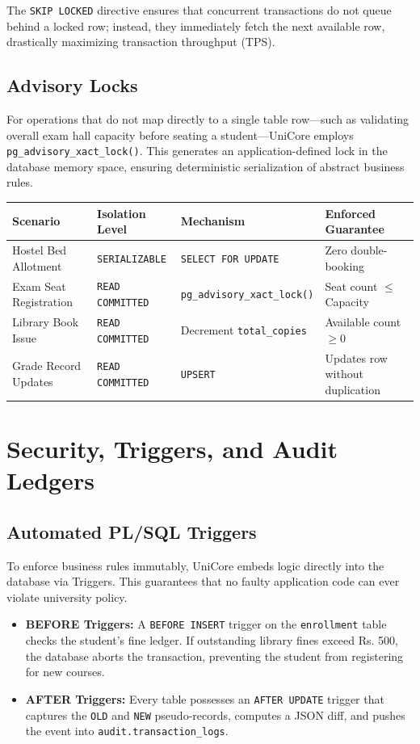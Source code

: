 \documentclass[11pt,a4paper]{article}
\begin{document}
The \texttt{SKIP LOCKED} directive ensures that concurrent transactions do not queue behind a locked row; instead, they immediately fetch the next available row, drastically maximizing transaction throughput (TPS).

\subsection{Advisory Locks}
For operations that do not map directly to a single table row—such as validating overall exam hall capacity before seating a student—UniCore employs \texttt{pg\_advisory\_xact\_lock()}. This generates an application-defined lock in the database memory space, ensuring deterministic serialization of abstract business rules.

\vspace{0.5cm}
\begin{tabularx}{\textwidth}{l l l X}
\toprule
\textbf{Scenario} & \textbf{Isolation Level} & \textbf{Mechanism} & \textbf{Enforced Guarantee} \\
\midrule
Hostel Bed Allotment & \texttt{SERIALIZABLE} & \texttt{SELECT FOR UPDATE} & Zero double-booking \\
Exam Seat Registration & \texttt{READ COMMITTED} & \texttt{pg\_advisory\_xact\_lock()} & Seat count $\le$ Capacity \\
Library Book Issue & \texttt{READ COMMITTED} & Decrement \texttt{total\_copies} & Available count $\ge 0$ \\
Grade Record Updates & \texttt{READ COMMITTED} & \texttt{UPSERT} & Updates row without duplication \\
\bottomrule
\end{tabularx}
\vspace{0.5cm}

\section{Security, Triggers, and Audit Ledgers}

\subsection{Automated PL/SQL Triggers}
To enforce business rules immutably, UniCore embeds logic directly into the database via Triggers. This guarantees that no faulty application code can ever violate university policy.
\begin{itemize}
    \item \textbf{BEFORE Triggers:} A \texttt{BEFORE INSERT} trigger on the \texttt{enrollment} table checks the student's fine ledger. If outstanding library fines exceed Rs. 500, the database aborts the transaction, preventing the student from registering for new courses.
    \item \textbf{AFTER Triggers:} Every table possesses an \texttt{AFTER UPDATE} trigger that captures the \texttt{OLD} and \texttt{NEW} pseudo-records, computes a JSON diff, and pushes the event into \texttt{audit.transaction\_logs}.
\end{itemize}
\end{document}
